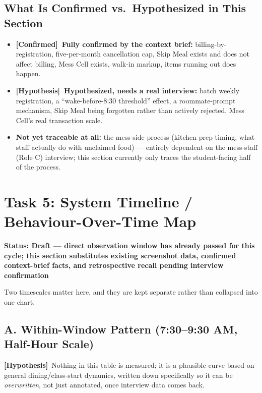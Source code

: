 \documentclass[11pt]{article}
\newcommand{\status}[1]{\noindent\textbf{Status: #1}\par\vspace{4pt}}
\newcommand{\confirmed}{\textbf{[Confirmed]}}
\newcommand{\hypo}{\textbf{[Hypothesis]}}
\begin{document}
\subsection{What Is Confirmed vs.\ Hypothesized in This Section}

\begin{itemize}
    \item \textbf{\confirmed\ Fully confirmed by the context brief:} billing-by-registration,
        five-per-month cancellation cap, Skip Meal exists and does not affect
        billing, Mess Cell exists, walk-in markup, items running out does happen.
    \item \textbf{\hypo\ Hypothesized, needs a real interview:} batch weekly
        registration, a ``wake-before-8:30 threshold'' effect, a roommate-prompt
        mechanism, Skip Meal being forgotten rather than actively rejected, Mess
        Cell's real transaction scale.
    \item \textbf{Not yet traceable at all:} the mess-side process (kitchen prep
        timing, what staff actually do with unclaimed food) --- entirely dependent on
        the mess-staff (Role C) interview; this section currently only traces the
        student-facing half of the process.
\end{itemize}

\newpage

\section{Task 5: System Timeline / Behaviour-Over-Time Map}
\status{Draft --- direct observation window has already passed for this cycle; this section substitutes existing screenshot data, confirmed context-brief facts, and retrospective recall pending interview confirmation}

Two timescales matter here, and they are kept separate rather than collapsed into one
chart.

\subsection{A. Within-Window Pattern (7:30--9:30 AM, Half-Hour Scale)}
\hypo\ Nothing in this table is measured; it is a plausible curve based on general
dining/class-start dynamics, written down specifically so it can be
\emph{overwritten}, not just annotated, once interview data comes back.
\end{document}
